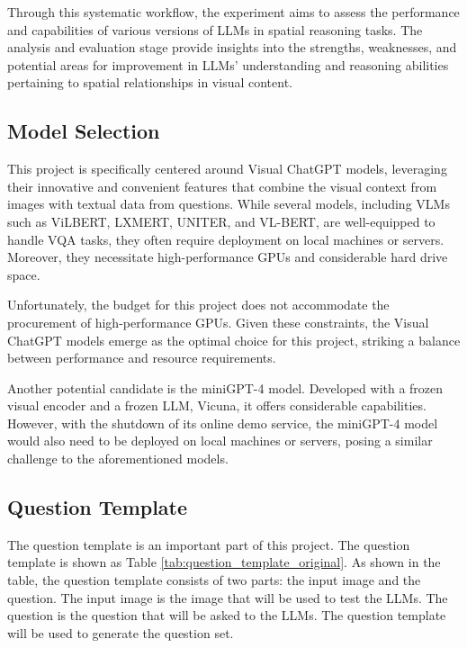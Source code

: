 \documentclass[twocolumn,11pt]{report}
\begin{document}
Through this systematic workflow, the experiment aims to assess the performance and capabilities of various versions of LLMs in spatial reasoning tasks. The analysis and evaluation stage provide insights into the strengths, weaknesses, and potential areas for improvement in LLMs' understanding and reasoning abilities pertaining to spatial relationships in visual content.

\subsection{Model Selection}
This project is specifically centered around Visual ChatGPT models, leveraging their innovative and convenient features that combine the visual context from images with textual data from questions\cite{wu2023visual}. While several models, including VLMs such as ViLBERT, LXMERT, UNITER, and VL-BERT, are well-equipped to handle VQA tasks, they often require deployment on local machines or servers. Moreover, they necessitate high-performance GPUs and considerable hard drive space.

Unfortunately, the budget for this project does not accommodate the procurement of high-performance GPUs. Given these constraints, the Visual ChatGPT models emerge as the optimal choice for this project, striking a balance between performance and resource requirements.

Another potential candidate is the miniGPT-4 model\cite{zhu2023minigpt4}. Developed with a frozen visual encoder and a frozen LLM, Vicuna, it offers considerable capabilities. However, with the shutdown of its online demo service, the miniGPT-4 model would also need to be deployed on local machines or servers, posing a similar challenge to the aforementioned models.


\subsection{Question Template}
The question template is an important part of this project. The question template is shown as Table \ref{tab:question_template_original}. As shown in the table, the question template consists of two parts: the input image and the question. The input image is the image that will be used to test the LLMs. The question is the question that will be asked to the LLMs. The question template will be used to generate the question set.
\end{document}
